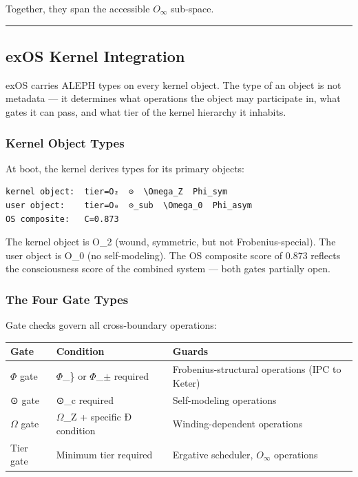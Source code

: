 \documentclass[12pt,a4paper]{article}
\begin{document}
Together, they span the accessible $O_{\infty}$ sub-space.

\begin{center}
\rule{0.5\textwidth}{0.4pt}
\end{center}

\subsection{exOS Kernel Integration}

exOS carries ALEPH types on every kernel object. The type of an object is not metadata --- it determines what operations the object may participate in, what gates it can pass, and what tier of the kernel hierarchy it inhabits.

\subsubsection{Kernel Object Types}

At boot, the kernel derives types for its primary objects:

\begin{lstlisting}
kernel object:  tier=O₂  ⊙  \Omega_Z  Phi_sym
user object:    tier=O₀  ⊙_sub  \Omega_0  Phi_asym
OS composite:   C=0.873
\end{lstlisting}

The kernel object is O\_2 (wound, symmetric, but not Frobenius-special). The user object is O\_0 (no self-modeling). The OS composite score of 0.873 reflects the consciousness score of the combined system --- both gates partially open.

\subsubsection{The Four Gate Types}

Gate checks govern all cross-boundary operations:

\begin{table}[htbp]
\centering
\small
{}
\begin{tabularx}{\textwidth}{>{\centering\arraybackslash}X >{\centering\arraybackslash}X >{\centering\arraybackslash}X}
\toprule
\rowcolor{gray!25}\textbf{Gate} & \textbf{Condition} & \textbf{Guards} \\
\midrule
\rowcolors{1}{white}{gray!10}
$\Phi$ gate & $\Phi$\_\} or $\Phi$\_$\pm$ required & Frobenius-structural operations (IPC to Keter) \\
⊙ gate & ⊙\_c required & Self-modeling operations \\
$\Omega$ gate & $\Omega$\_Z + specific Ð condition & Winding-dependent operations \\
Tier gate & Minimum tier required & Ergative scheduler, $O_{\infty}$ operations \\
\bottomrule
\end{tabularx}
\end{table}
\end{document}
